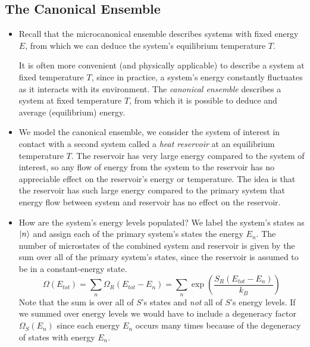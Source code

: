 \documentclass[11pt, a4paper]{article}
\begin{document}
\subsection{The Canonical Ensemble}
\begin{itemize}
	\item Recall that the microcanonical ensemble describes systems with fixed energy $ E $, from which we can deduce the system's equilibrium temperature $ T $. 
	
	It is often more convenient (and physically applicable) to describe a system at fixed temperature $ T $, since in practice, a system's energy constantly fluctuates as it interacts with its environment. The \textit{canonical ensemble} describes a system at fixed temperature $ T $, from which it is possible to deduce and average (equilibrium) energy.
	
	\item We model the canonical ensemble, we consider the system of interest in contact with a second system called a \textit{heat reservoir} at an equilibrium temperature $ T $. The reservoir has very large energy compared to the system of interest, so any flow of energy from the system to the reservoir has no appreciable effect on the reservoir's energy or temperature. The idea is that the reservoir has such large energy compared to the primary system that energy flow between system and reservoir has no effect on the reservoir.
	
	\item How are the system's energy levels populated? We label the system's states as $ \ket{n} $ and assign each of the primary system's states the energy $ E_{n} $. The number of microstates of the combined system and reservoir is given by the sum over all of the primary system's states, since the reservoir is assumed to be in a constant-energy state.
	\begin{equation*}
		\Omega(E_{tot}) = \sum_{n}\Omega_{R}(E_{tot} - E_{n}) = \sum_{n} \exp(\frac{S_{R}(E_{tot}- E_{n})}{k_{B}})
	\end{equation*}
	Note that the sum is over all of $ S $'s states and \textit{not} all of $ S $'s energy levels. If we summed over energy levels we would have to include a degeneracy factor $ \Omega_{S}(E_{n}) $ since each energy $ E_{n} $ occurs many times because of the degeneracy of states with energy $ E_{n} $.
	

\end{itemize}
\end{document}
